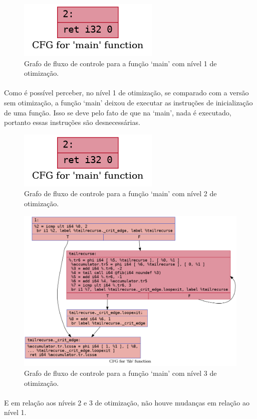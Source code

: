 \documentclass[12pt]{article}
\begin{document}
\begin{figure}
    \centering
    \includegraphics[width=0.5\linewidth]{private_.main_O1.png}
    \caption{Grafo de fluxo de controle para a função ‘main’ com nível 1 de otimização.}
\end{figure}

\paragraph{}Como é possível perceber, no nível 1 de otimização, se comparado com a versão sem otimização, a função ‘main’ deixou de executar as instruções de inicialização de uma função. Isso se deve pelo fato de que na ‘main’, nada é executado, portanto essas instruções são desnecessárias.

\begin{figure}
    \centering
    \includegraphics[width=0.5\linewidth]{private_.main_O2.png}
    \caption{Grafo de fluxo de controle para a função ‘main’ com nível 2 de otimização.}
\end{figure}

\begin{figure}
    \centering
    \includegraphics[width=0.5\linewidth]{fib2_.fib_O3.png}
    \caption{Grafo de fluxo de controle para a função ‘main’ com nível 3 de otimização.}
\end{figure}

\paragraph{}E em relação aos níveis 2 e 3 de otimização, não houve mudanças em relação ao nível 1.
\end{document}
